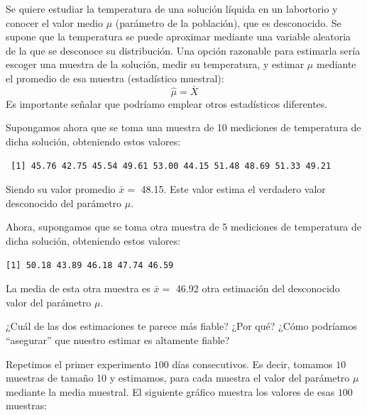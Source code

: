 \documentclass[
  letterpaper,
  DIV=11,
  numbers=noendperiod]{scrreprt}
\begin{document}
\begin{tcolorbox}[enhanced jigsaw, arc=.35mm, breakable, coltitle=black, left=2mm, opacityback=0, bottomtitle=1mm, colbacktitle=quarto-callout-tip-color!10!white, title=\textcolor{quarto-callout-tip-color}{\faLightbulb}\hspace{0.5em}{Ejemplo. Diferencia entre parámetro y estadístico}, titlerule=0mm, colback=white, colframe=quarto-callout-tip-color-frame, bottomrule=.15mm, rightrule=.15mm, opacitybacktitle=0.6, toptitle=1mm, toprule=.15mm, leftrule=.75mm]

Se quiere estudiar la temperatura de una solución líquida en un
labortorio y conocer el valor medio \(\mu\) (parámetro de la población),
que es desconocido. Se supone que la temperatura se puede aproximar
mediante una variable aleatoria de la que se desconoce su distribución.
Una opción razonable para estimarla sería escoger una muestra de la
solución, medir su temperatura, y estimar \(\mu\) mediante el promedio
de esa muestra (estadístico muestral): \[ \hat{\mu}=\bar{X}\] Es
importante señalar que podríamo emplear otros estadísticos diferentes.

Supongamos ahora que se toma una muestra de 10 mediciones de temperatura
de dicha solución, obteniendo estos valores:

\begin{verbatim}
 [1] 45.76 42.75 45.54 49.61 53.00 44.15 51.48 48.69 51.33 49.21
\end{verbatim}

Siendo su valor promedio \(\bar{x}=\) 48.15. Este valor estima el
verdadero valor desconocido del parámetro \(\mu\).

Ahora, supongamos que se toma otra muestra de 5 mediciones de
temperatura de dicha solución, obteniendo estos valores:

\begin{verbatim}
[1] 50.18 43.89 46.18 47.74 46.59
\end{verbatim}

La media de esta otra muestra es \(\bar{x}=\) 46.92 otra estimación del
desconocido valor del parámetro \(\mu\).

¿Cuál de las dos estimaciones te parece más fiable? ¿Por qué? ¿Cómo
podríamos ``asegurar'' que nuestro estimar es altamente fiable?

Repetimos el primer experimento \(100\) días consecutivos. Es decir,
tomamos \(10\) muestras de tamaño 10 y estimamos, para cada muestra el
valor del parámetro \(\mu\) mediante la media muestral. El siguiente
gráfico muestra los valores de esas \(100\) muestras:


\end{tcolorbox}
\end{document}

